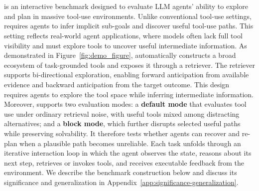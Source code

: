 \section{\bench{}}
\label{sec:benchmark}



\BENCH{} is an interactive benchmark designed to evaluate LLM agents’ ability to explore and plan in massive tool-use environments.
Unlike conventional tool-use settings, \bench{} requires agents to infer implicit sub-goals and discover useful tool-use paths.
This setting reflects real-world agent applications, where models often lack full tool visibility and must explore tools to uncover useful intermediate information.
As demonstrated in Figure~\ref{fig:demo_figure}, \bench{} automatically constructs a broad ecosystem of task-grounded tools and exposes it through a retriever.
The retriever supports bi-directional exploration, enabling forward anticipation from available evidence and backward anticipation from the target outcome.
This design requires agents to explore the tool space while inferring intermediate information.
Moreover, \bench{} supports two evaluation modes: a \textbf{default mode} that evaluates tool use under ordinary retrieval noise, with useful tools mixed among distracting alternatives; and a \textbf{block mode}, which further disrupts selected useful paths while preserving solvability.
It therefore tests whether agents can recover and re-plan when a plausible path becomes unreliable.
Each task unfolds through an iterative interaction loop in which the agent observes the state, reasons about its next step, retrieves or invokes tools, and receives executable feedback from the environment. 
We describe the benchmark construction below and discuss its significance and generalization in Appendix~\ref{app:significance-generalization}.



